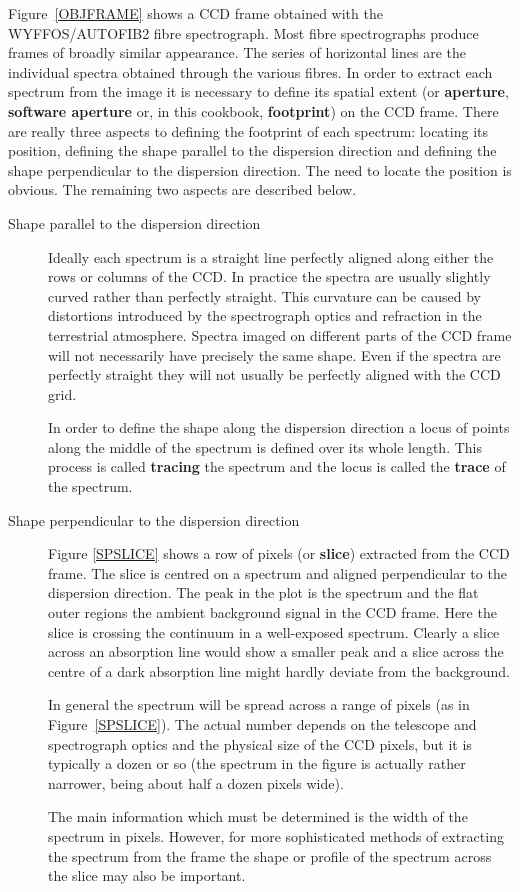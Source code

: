\documentclass[twoside,11pt]{article}
\begin{document}
Figure~\ref{OBJFRAME} shows a CCD frame obtained with the WYFFOS/AUTOFIB2
fibre spectrograph.  Most fibre spectrographs produce frames of broadly
similar appearance.  The series of horizontal lines are the individual
spectra obtained through the various fibres.  In order to extract each
spectrum from the image it is necessary to define its spatial extent (or
{\bf aperture}, {\bf software aperture} or, in this cookbook, {\bf
footprint}) on the CCD frame.  There are really three aspects to defining
the footprint of each spectrum: locating its position, defining the shape
parallel to the dispersion direction and defining the shape perpendicular
to the dispersion direction.  The need to locate the position is obvious.
The remaining two aspects are described below.

\begin{description}

  \item[Shape parallel to the dispersion direction] Ideally each
   spectrum is a straight line perfectly aligned along either the
   rows or columns of the CCD.  In practice the spectra are usually
   slightly curved rather than perfectly straight.  This curvature can
   be caused by distortions introduced by the spectrograph optics and
   refraction in the terrestrial atmosphere.  Spectra imaged on
   different parts of the CCD frame will not necessarily have precisely
   the same shape.  Even if the spectra are perfectly straight they
   will not usually be perfectly aligned with the CCD grid.

   In order to define the shape along the dispersion direction a locus
   of points along the middle of the spectrum is defined over its whole
   length.  This process is called {\bf tracing} the spectrum and the
   locus is called the {\bf trace} of the spectrum.

  \item[Shape perpendicular to the dispersion direction] Figure
   \ref{SPSLICE} shows a row of pixels (or {\bf slice}) extracted from
   the CCD frame.  The slice is centred on a spectrum and aligned
   perpendicular to the dispersion direction.  The peak in the plot is
   the spectrum and the flat outer regions the ambient background signal
   in the CCD frame.  Here the slice is crossing the continuum in a
   well-exposed spectrum.  Clearly a slice across an absorption line
   would show a smaller peak and a slice across the centre of a dark
   absorption line might hardly deviate from the background.

   In general the spectrum will be spread across a range of pixels
   (as in Figure~\ref{SPSLICE}).  The actual number depends on the
   telescope and spectrograph optics and the physical size of the
   CCD pixels, but it is typically a dozen or so (the spectrum in
   the figure is actually rather narrower, being about half a dozen
   pixels wide).

   The main information which must be determined is the width of the
   spectrum in pixels.  However, for more sophisticated methods of
   extracting the spectrum from the frame the shape or profile of the
   spectrum across the slice may also be important.

\end{description}
\end{document}
